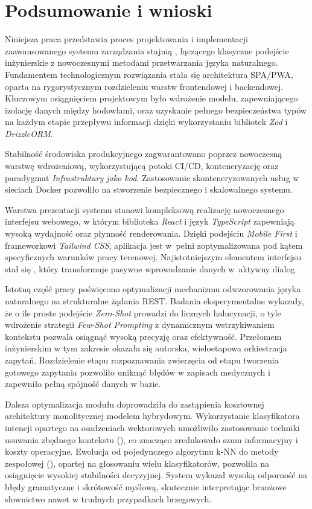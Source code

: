 \chapter{Podsumowanie i wnioski}
\label{chapters:07-podsumowanie}

Niniejsza praca przedstawia proces projektowania i implementacji zaawansowanego systemu zarządzania stajnią , łączącego klasyczne podejście inżynierskie z nowoczesnymi metodami przetwarzania języka naturalnego. Fundamentem technologicznym rozwiązania stała się architektura SPA/PWA, oparta na rygorystycznym rozdzieleniu warstw frontendowej i backendowej. Kluczowym osiągnięciem projektowym było wdrożenie modelu, zapewniającego izolację danych między hodowlami, oraz uzyskanie pełnego bezpieczeństwa typów na każdym etapie przepływu informacji dzięki wykorzystaniu bibliotek \textit{Zod} i \textit{DrizzleORM}. 

Stabilność środowiska produkcyjnego zagwarantowano poprzez nowoczesną warstwę wdrożeniową, wykorzystującą potoki CI/CD, konteneryzację oraz paradygmat \textit{Infrastruktury jako kod}. Zastosowanie skonteneryzowanych usług w sieciach Docker pozwoliło na stworzenie bezpiecznego i skalowalnego systemu.

Warstwa prezentacji systemu stanowi kompleksową realizację nowoczesnego interfejsu webowego, w którym biblioteka \textit{React} i język \textit{TypeScript} zapewniają wysoką wydajność oraz płynność renderowania. Dzięki podejściu \textit{Mobile First} i frameworkowi \textit{Tailwind CSS}, aplikacja jest w~pełni zoptymalizowana pod kątem specyficznych warunków pracy terenowej. Najistotniejszym elementem interfejsu stał się , który transformuje pasywne wprowadzanie danych w~aktywny dialog.

Istotną część pracy poświęcono optymalizacji mechanizmu odwzorowania języka naturalnego na strukturalne żądania REST. Badania eksperymentalne wykazały, że o ile proste podejście \textit{Zero-Shot} prowadzi do licznych halucynacji, o tyle wdrożenie strategii \textit{Few-Shot Prompting} z dynamicznym wstrzykiwaniem kontekstu pozwala osiągnąć wysoką precyzję oraz efektywność. Przełomem inżynierskim w tym zakresie okazała się autorska, wieloetapowa orkiestracja zapytań. Rozdzielenie etapu rozpoznawania zwierzęcia od etapu tworzenia gotowego zapytania pozwoliło uniknąć błędów w zapisach medycznych i zapewniło pełną spójność danych w bazie.

Dalsza optymalizacja modułu  doprowadziła do zastąpienia kosztownej architektury monolitycznej modelem hybrydowym. Wykorzystanie klasyfikatora intencji opartego na osadzeniach wektorowych umożliwiło zastosowanie techniki usuwania zbędnego kontekstu (), co znacząco zredukowało szum informacyjny i koszty operacyjne. Ewolucja od pojedynczego algorytmu k-NN do metody zespołowej (), opartej na głosowaniu wielu klasyfikatorów, pozwoliła na osiągnięcie wysokiej stabilności decyzyjnej. System wykazał wysoką odporność na błędy gramatyczne i skrótowość myślową, skutecznie interpretując branżowe słownictwo nawet w trudnych przypadkach brzegowych.

